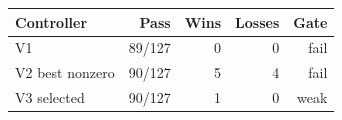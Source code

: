 \begin{tabular}{lrrrr}\toprule Controller & Pass & Wins & Losses & Gate\\\midrule V1 & 89/127 & 0 & 0 & fail\\ V2 best nonzero & 90/127 & 5 & 4 & fail\\ V3 selected & 90/127 & 1 & 0 & weak\\\bottomrule\end{tabular}
